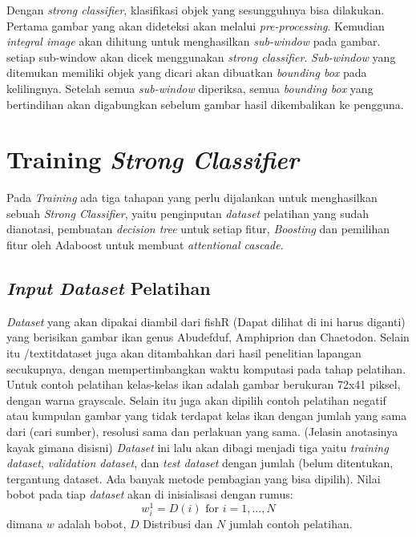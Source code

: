 Dengan \emph{strong classifier}, klasifikasi objek yang sesungguhnya bisa dilakukan. 
Pertama gambar yang akan dideteksi akan melalui \emph{pre-processing}. 
Kemudian \emph{integral image} akan dihitung untuk 
menghasilkan \emph{sub-window} pada gambar. setiap sub-window akan dicek menggunakan 
\emph{strong classifier}. \emph{Sub-window} yang ditemukan memiliki objek yang 
dicari akan dibuatkan \emph{bounding box} pada kelilingnya. Setelah semua 
\emph{sub-window} diperiksa, semua \emph{bounding box} yang bertindihan akan 
digabungkan sebelum gambar hasil dikembalikan ke pengguna.

\section{Training \emph{Strong Classifier}}

Pada \textit{Training} ada tiga tahapan yang perlu dijalankan 
untuk menghasilkan sebuah \emph{Strong Classifier}, 
yaitu penginputan \textit{dataset} pelatihan yang sudah dianotasi, 
pembuatan \emph{decision tree} untuk setiap fitur, 
\emph{Boosting }dan pemilihan fitur oleh Adaboost untuk membuat \emph{attentional cascade}.

\subsection{\textit{Input Dataset} Pelatihan}

\textit{Dataset} yang akan dipakai diambil dari fishR (Dapat dilihat di 
 ini harus diganti) yang 
berisikan gambar ikan genus Abudefduf, Amphiprion dan Chaetodon. Selain itu 
/textit{dataset} juga akan ditambahkan dari hasil penelitian lapangan 
secukupnya, dengan mempertimbangkan waktu komputasi pada tahap 
pelatihan.
Untuk contoh pelatihan kelas-kelas ikan adalah gambar berukuran 72x41 piksel, 
dengan warna grayscale. Selain itu juga akan dipilih contoh 
pelatihan negatif atau kumpulan gambar yang tidak terdapat kelas 
ikan dengan jumlah yang sama dari (cari sumber), resolusi sama dan perlakuan 
yang sama. (Jelasin anotasinya kayak gimana disisni) \textit{Dataset} ini lalu 
akan dibagi menjadi tiga yaitu \textit{training dataset}, 
\textit{validation dataset}, dan \emph{test dataset} dengan jumlah 
(belum ditentukan, tergantung dataset. 
Ada banyak metode pembagian yang bisa dipilih).
Nilai bobot pada tiap \textit{dataset} akan di inisialisasi dengan rumus:
\begin{equation}
  w^1_i = D(i) \text{ for } i=1,...,N
\end{equation}
dimana $w$ adalah bobot, $D$ Distribusi dan $N$ jumlah contoh pelatihan.

